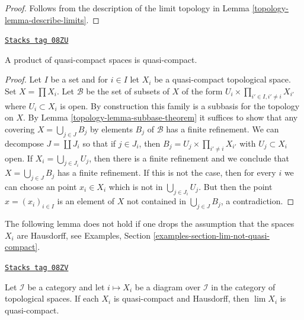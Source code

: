 \begin{proof}

Follows from the description of the limit topology
in Lemma \ref{topology-lemma-describe-limits}.
\end{proof}

\begin{theorem}[Tychonov]

\label{topology-theorem-tychonov}
\href{https://stacks.math.columbia.edu/tag/08ZU}{\texttt{Stacks tag 08ZU}}

A product of quasi-compact spaces is quasi-compact.
\end{theorem}

\begin{proof}

Let $I$ be a set and for $i \in I$ let $X_i$ be a quasi-compact topological
space. Set $X = \prod X_i$. Let $\mathcal{B}$ be the set of subsets of $X$
of the form $U_i \times \prod_{i' \in I, i' \not = i} X_{i'}$ where
$U_i \subset X_i$ is open. By construction this family is a subbasis
for the topology on $X$. By Lemma \ref{topology-lemma-subbase-theorem} it
suffices to show that any covering $X = \bigcup_{j \in J} B_j$
by elements $B_j$ of $\mathcal{B}$ has a finite refinement.
We can decompose $J = \coprod J_i$ so that if $j \in J_i$, then
$B_j = U_j \times \prod_{i' \not = i} X_{i'}$ with $U_j \subset X_i$
open. If $X_i = \bigcup_{j \in J_i} U_j$, then there is a finite
refinement and we conclude that $X = \bigcup_{j \in J} B_j$
has a finite refinement. If this is not the case, then for every $i$
we can choose an point $x_i \in X_i$ which is not in
$\bigcup_{j \in J_i} U_j$. But then the point $x = (x_i)_{i \in I}$
is an element of $X$ not contained in $\bigcup_{j \in J} B_j$, a
contradiction.
\end{proof}

The following lemma does not hold if one drops the assumption that
the spaces $X_i$ are Hausdorff, see
Examples, Section \ref{examples-section-lim-not-quasi-compact}.

\begin{lemma}
\label{topology-lemma-inverse-limit-quasi-compact}
\href{https://stacks.math.columbia.edu/tag/08ZV}{\texttt{Stacks tag 08ZV}}

Let $\mathcal{I}$ be a category and let $i \mapsto X_i$
be a diagram over $\mathcal{I}$ in the category of topological
spaces. If each $X_i$ is quasi-compact and Hausdorff, then
$\lim X_i$ is quasi-compact.
\end{lemma}

